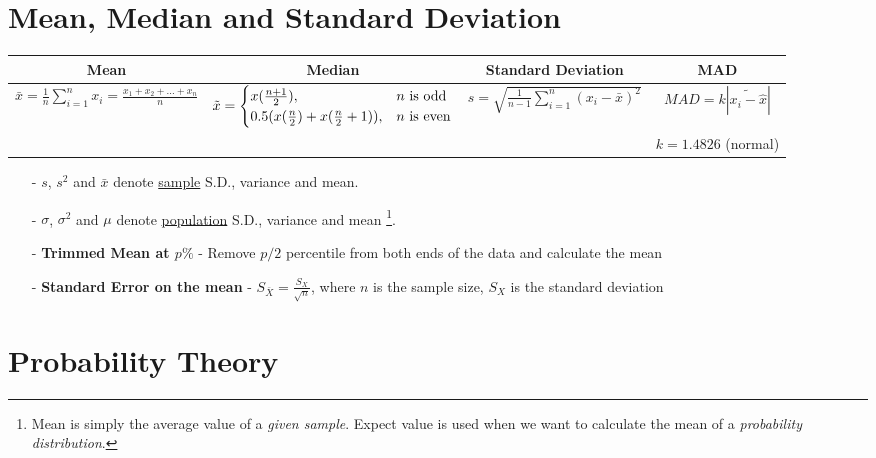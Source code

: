 \documentclass{article}
\begin{document}
\section{Mean, Median and Standard Deviation}

\begin{table}[H]
    \centering
    \begin{adjustbox}{width=\columnwidth,center}
    \begin{tabular}{c| c| c | c}
        Mean & Median & Standard Deviation & MAD\\ [0.7ex] \hline 
        $\displaystyle \bar{x}=\frac{1}{n}\sum_{i=1}^{n}x_{i} = \frac{x_{1}+x_{2}+...+x_{n}}{n}$ & 
        $\Tilde{x} = \begin{cases} 
        x(\frac{n+1}{2}), & n \ \text{is odd} \\
        0.5(x(\frac{n}{2})+x(\frac{n}{2}+1)), & n \ \text{is even}
        \end{cases}$ &
        $\displaystyle s = \sqrt{\frac{1}{n-1}\sum_{i=1}^{n} (x_{i}-\bar{x})^{2}}$
        & $\displaystyle MAD = k|\widetilde{x_{i} - \hat{x}}|$ \\
          &  &  &  $k = 1.4826$ \footnotesize{(normal)}\\
    \end{tabular}
    \end{adjustbox}
\end{table}

\begin{itemize}
    \item[-] $s$, $s^{2}$ and $\bar{x}$ denote \underline{sample} S.D., variance and mean.
    \item[-] $\sigma$, $\sigma^{2}$ and $\mu$ denote \underline{population} S.D., variance and mean \footnote{Mean is simply the average value of a \textit{given sample}. Expect value is used when we want to calculate the mean of a \textit{probability distribution}.}.\\
    
    \item[-] \textbf{Trimmed Mean at $p\%$} - Remove $p/2$ percentile from both ends of the data and calculate the mean
    \item[-] \textbf{Standard Error on the mean} - 
    $\displaystyle S_{\bar{X}} = \frac{S_{X}}{\sqrt{n}}$, where $n$ is the sample size, $S_{X}$ is the standard deviation
\end{itemize}

\section{Probability Theory}
\end{document}
